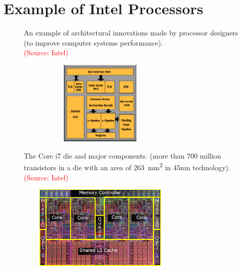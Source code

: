 \documentclass[
  12pt,
  a4paper,
]{report}
\begin{document}
\label{IntelProcessorExample}
\section{Example of Intel Processors}\label{example-of-intel-processors}

\begin{figure}[h]
\centering
    \begin{minipage}{0.48\textwidth}
        \begin{tcolorbox}[colback=boxbodycol, colframe=boxheadcol, title=\textcolor{red}{\emph{Pentium Processor Architecture (simplified)}}]
            An example of architectural innovations made by processor designers (to improve computer systems performance).\\
            \textcolor{red}{(Source: Intel)}
        \end{tcolorbox}
    \end{minipage}%
    \begin{minipage}{0.48\textwidth}
        \centering
        \includegraphics[width=8cm, height=4cm, keepaspectratio=false]{images/22pentium.png}
    \end{minipage}
    \vspace{0.5cm} %

    \begin{minipage}{0.48\textwidth}
        \begin{tcolorbox}[colback=boxbodycol, colframe=boxheadcol, title=\textcolor{red}{\emph{Intel Core i7}}]
            The Core i7 die and major components. (more than 700 million transistors in a die with an area of \qty{263}{\mm\squared} in 45nm technology).\\
            \textcolor{red}{(Source: Intel)}
        \end{tcolorbox}
    \end{minipage}%
    \begin{minipage}{0.48\textwidth}
        \centering
        \includegraphics[width=8cm, height=4cm, keepaspectratio=false]{images/corei7diagram.png}
    \end{minipage}
\end{figure}
\end{document}
